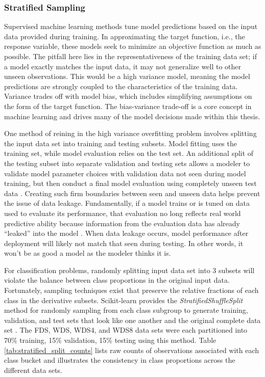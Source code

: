 \subsubsection{Stratified Sampling}\label{ch3:strat_sample}
Supervised machine learning methods tune model predictions based on the input data provided during training. In approximating the target function, i.e., the response variable, these models seek to minimize an objective function as much as possible. The pitfall here lies in the representativeness of the training data set; if a model exactly matches the input data, it may not generalize well to other unseen observations. This would be a high variance model, meaning the model predictions are strongly coupled to the characteristics of the training data. Variance trades off with model bias, which includes simplifying assumptions on the form of the target function. The bias-variance trade-off is a core concept in machine learning \citep[p.\ 33-36]{james_introduction_2013} and drives many of the model decisions made within this thesis.

One method of reining in the high variance overfitting problem involves splitting the input data set into training and testing subsets. Model fitting uses the training set, while model evaluation relies on the test set. An additional split of the testing subset into separate validation and testing sets allows a modeler to validate model parameter choices with validation data not seen during model training, but then conduct a final model evaluation using completely unseen test data \citep[p.\ 222]{hastie_elements_2009}. Creating such firm boundaries between seen and unseen data helps prevent the issue of data leakage. Fundamentally, if a model trains or is tuned on data used to evaluate its performance, that evaluation no long reflects real world predictive ability because information from the evaluation data has already ``leaked'' into the model \citep{kaufman_leakage_2012}. When data leakage occurs, model performance after deployment will likely not match that seen during testing. In other words, it won’t be as good a model as the modeler thinks it is.

For classification problems, randomly splitting input data set into 3 subsets will violate the balance between class proportions in the original input data. Fortunately, sampling techniques exist that preserve the relative fractions of each class in the derivative subsets. Scikit-learn provides the \textit{StratifiedShuffleSplit} method for randomly sampling from each class subgroup to generate training, validation, and test sets that look like one another and the original complete data set \citep{scikit-learn_sklearnmodel_selectionstratifiedshufflesplit_2021}. The FDS, WDS, WDS4, and WDS8 data sets were each partitioned into 70\% training, 15\% validation, 15\% testing using this method. Table \ref{tab:stratified_split_counts} lists raw counts of observations associated with each class bucket and illustrates the consistency in class proportions across the different data sets.

